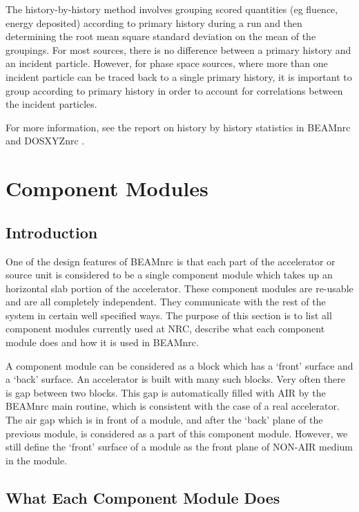 \documentclass[12pt,twoside]{article}
\begin{document}
The history-by-history method involves grouping scored quantities (eg
fluence, energy deposited) according to primary history during a run and
then determining the root mean square standard deviation
on the mean of the groupings.  For most sources, there is no difference
between a primary history and an incident particle.  However, for phase
space sources, where more than one incident particle can be traced
back to a single primary history, it is important to group according
to primary history in order to account for correlations between the
incident particles.

For more information, see the report on history by history
statistics in BEAMnrc and DOSXYZnrc \cite{Wa02a}.

\section{Component Modules}
\label{CMs}

\subsection{Introduction}

One of the design features of BEAMnrc is that each part of the
accelerator or source unit is considered to be a single component module which
takes up an horizontal slab portion of the accelerator. These component modules
are re-usable and are all completely independent. They communicate with the
rest of the system in certain well specified ways. The purpose of this section
is to list all component modules currently   used at NRC, describe what each
component module does and how it is used in BEAMnrc.

A component module can be considered as a block which has a `front' surface and
a `back' surface. An accelerator is built with many such blocks. Very often
there is gap between two blocks. This gap is automatically filled with AIR by
the BEAMnrc main routine, which is consistent with the case of a real accelerator.
The air gap which is in front of a module, and after the `back' plane of the
previous module, is considered as a part of this component module. However, we
still define the `front' surface of a module as the front plane of NON-AIR
medium in the module.

\subsection{What Each Component Module Does}
\end{document}
